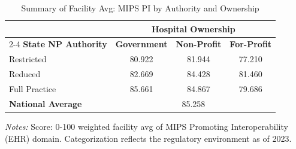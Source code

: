\begin{table}[htbp]
    \centering
    \caption{Summary of Facility Avg: MIPS PI by Authority and Ownership}
    \label{tab:mips_pi_score_own}
    \vspace{0.2cm}
    \begin{tabular}{lccc}
        \toprule
        & \multicolumn{3}{c}{\textbf{Hospital Ownership}} \\
        \cmidrule(lr){2-4}
        \textbf{State NP Authority} & \textbf{Government} & \textbf{Non-Profit} & \textbf{For-Profit} \\
        \midrule
        Restricted & 80.922 & 81.944 & 77.210 \\
        Reduced & 82.669 & 84.428 & 81.460 \\
        Full Practice & 85.661 & 84.867 & 79.686 \\
        \midrule
        \textbf{National Average} & \multicolumn{3}{c}{85.258} \\
        \bottomrule
    \end{tabular}
    \vspace{0.1cm}
    \begin{minipage}{0.85\textwidth}
        \footnotesize \textit{Notes:} Score: 0-100 weighted facility avg of MIPS Promoting Interoperability (EHR) domain. Categorization reflects the regulatory environment as of 2023.
    \end{minipage}
\end{table}